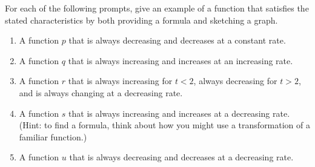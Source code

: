 \documentclass[nooutcomes]{ximera}
\begin{document}
\begin{exploration}

For each of the following prompts, give an example of a function that satisfies the stated characteristics by both providing a formula and sketching a graph.

\begin{enumerate}[label=\alph*.]
\item A function $p$ that is always decreasing and decreases at a constant rate.
\item A function $q$ that is always increasing and increases at an increasing rate.
\item A function $r$ that is always increasing for $t < 2$, always decreasing for $t > 2$, and is always changing at a decreasing rate.
\item A function $s$ that is always increasing and increases at a decreasing rate.  (Hint: to find a formula, think about how you might use a transformation of a familiar function.)
\item A function $u$ that is always decreasing and decreases at a decreasing rate.

\end{enumerate}

\end{exploration}
\end{document}
